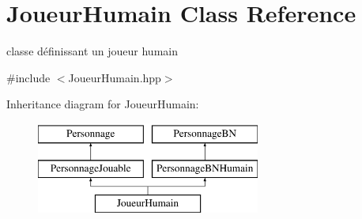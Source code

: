 \hypertarget{classJoueurHumain}{\section{Joueur\-Humain Class Reference}
\label{classJoueurHumain}
}


classe définissant un joueur humain  




{\ttfamily \#include $<$Joueur\-Humain.\-hpp$>$}

Inheritance diagram for Joueur\-Humain\-:\begin{figure}[H]
\begin{center}
\leavevmode
\includegraphics[height=3.000000cm]{classJoueurHumain}
\end{center}
\end{figure}
